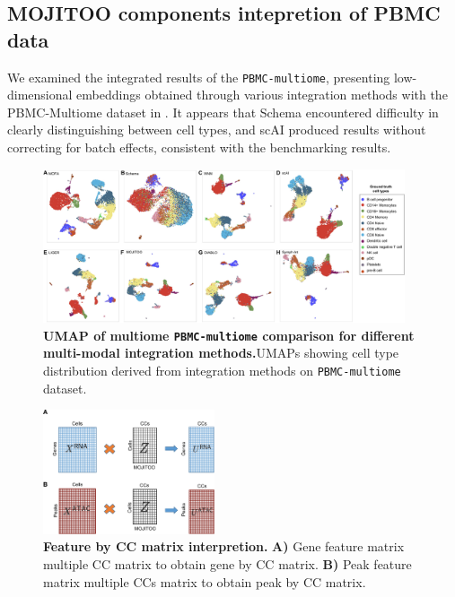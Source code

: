 \subsection{MOJITOO components intepretion of PBMC data}
\label{MOJITOO:out:pbmc}
We examined the integrated results of the \texttt{PBMC-multiome}, presenting low-dimensional embeddings obtained through various integration methods with the PBMC-Multiome dataset in . It appears that Schema encountered difficulty in clearly distinguishing between cell types, and scAI produced results without correcting for batch effects, consistent with the benchmarking results.
\begin{figure}[!ht]
	\centering
	\includegraphics[width=0.95\textwidth]{pbmc_multiome_umap/fig}
	\vspace{0.1cm}
	\caption[UMAP of multiome PBMC comparison for different multi-modal integration methods.]{\textbf{UMAP of multiome \texttt{PBMC-multiome} comparison for different multi-modal integration methods.}UMAPs showing cell type distribution derived from integration methods on \texttt{PBMC-multiome} dataset. }
	\label{fig:pbmc_multiome_umap}
\end{figure}


\begin{figure}[!h]
	\centering
	\includegraphics[width=0.45\textwidth]{Zfeature/fig}
	\vspace{0.1cm}
	\caption[Feature by CC matrix interpretion.]{\textbf{Feature by CC matrix interpretion.} \textbf{A)} Gene feature matrix multiple CC matrix to obtain gene by CC matrix. \textbf{B)} Peak feature matrix multiple CCs matrix to obtain peak by CC matrix.}
	\label{fig:Zfeature}
\end{figure}

